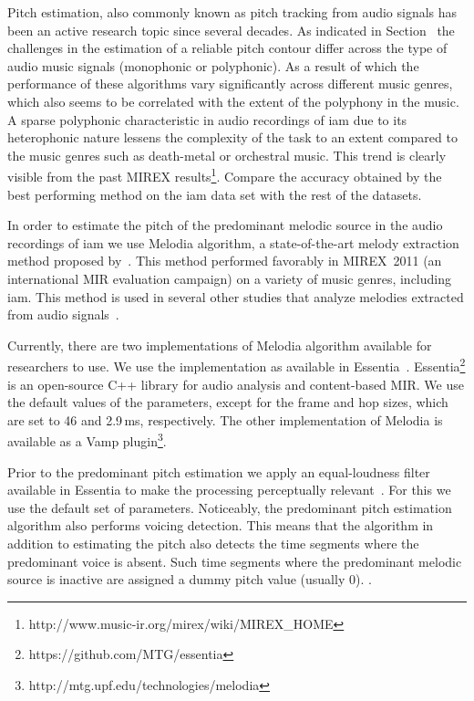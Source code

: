{{Pitch estimation, also commonly known as pitch tracking from audio signals has been an active research topic since several decades. As indicated in Section~ the challenges in the estimation of a reliable pitch contour differ across the type of audio music signals (monophonic or polyphonic). As a result of which the performance of these algorithms vary significantly across different music genres, which also seems to be correlated with the extent of the polyphony in the music. A sparse polyphonic characteristic in audio recordings of \gls{iam} due to its heterophonic nature lessens the complexity of the task to an extent compared to the music genres such as death-metal or orchestral music. This trend is clearly visible from the past MIREX results\footnote{http://www.music-ir.org/mirex/wiki/MIREX\_HOME}. Compare the accuracy obtained by the best performing method on the \gls{iam} data set with the rest of the datasets.

In order to estimate the pitch of the predominant melodic source in the audio recordings of \gls{iam} we use Melodia algorithm, a state-of-the-art melody extraction method proposed by~\cite{Salamon2012}. This method performed favorably in MIREX~2011 (an international MIR evaluation campaign) on a variety of music genres, including \gls{iam}. This method is used in several other studies that analyze melodies extracted from audio signals~\citep{Dutta2014,Ishwar2013,Rao2014,koduri2014intonation,senturk2013score,pikrakis2012tracking}.


Currently, there are two implementations of Melodia algorithm available for researchers to use. We use the implementation as available in Essentia~\citep{essentia}. Essentia\footnote{https://github.com/MTG/essentia} is an open-source C++ library for audio analysis and content-based MIR. We use the default values of the parameters, except for the frame and hop sizes, which are set to 46 and 2.9\,ms, respectively. The other implementation of Melodia is available as a Vamp plugin\footnote{http://mtg.upf.edu/technologies/melodia}. 

Prior to the predominant pitch estimation we apply an equal-loudness filter available in Essentia to make the processing perceptually relevant~. For this we use the default set of parameters. Noticeably, the predominant pitch estimation algorithm also performs voicing detection. This means that the algorithm in addition to estimating the pitch also detects the time segments where the predominant voice is absent. Such time segments where the predominant melodic source is inactive are assigned a dummy pitch value (usually 0). .

}}
